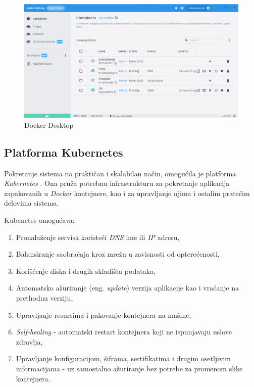 \documentclass[12pt,oneside]{memoir}
\begin{document}
\begin{figure}[!ht]
  \centering
  \includegraphics[width=1.0\textwidth]{./images/docker_desktop.png}
  \caption{Docker Desktop}
  \label{fig:dockerdesktop}
\end{figure}

\subsection{Platforma Kubernetes}
\label{subs:kubernetes_platform}

Pokretanje sistema na praktičan i skalabilan način, omogućila je platforma \emph{Kubernetes} \cite{Kubernetes}. Ona pruža potrebnu infrastrukturu za pokretanje aplikacija zapakovanih u \emph{Docker} kontejnere, kao i za upravljanje njima i ostalim pratećim delovima sistema.

Kubenetes omogućava:
\begin{enumerate}
\item Pronalaženje servisa koristeći \emph{DNS} ime ili \emph{IP} adresu,
\item Balansiranje saobraćaja kroz mrežu u zavisnosti od opterećenosti,
\item Korišćenje diska i drugih skladišta podataka,
\item Automatsko ažuriranje (eng. \emph{update}) verzija aplikacije kao i vraćanje na prethodnu verziju,
\item Upravljanje resursima i pakovanje kontejnera na mašine,
\item \emph{Self-healing} - automatski restart kontejnera koji ne ispunjavaju uslove zdravlja,
\item Upravljanje konfiguracijom, šiframa, sertifikatima i drugim osetljivim informacijama - uz samostalno ažuriranje bez potrebe za promenom slike kontejnera.
\end{enumerate}
\end{document}

